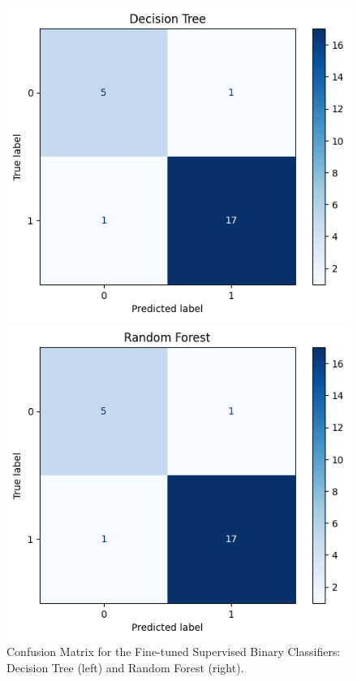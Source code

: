 \documentclass[12pt,a4paper]{article}
\numberwithin{figure}{section}
\numberwithin{table}{section}
\numberwithin{definition}{section}
\begin{document}
\begin{figure}[!h]
  \centering
  \begin{minipage}{0.5\textwidth}
    \includegraphics[width=\textwidth]{CM_decision_tree.png}
  \end{minipage}\hfill
  \begin{minipage}{0.5\textwidth}
    \includegraphics[width=\textwidth]{CM_random_forest.png}
  \end{minipage}
    \caption{Confusion Matrix for the Fine-tuned Supervised Binary Classifiers: Decision Tree (left) and Random Forest (right).}
    \label{fig:cmsupervised}
\end{figure}
\end{document}
